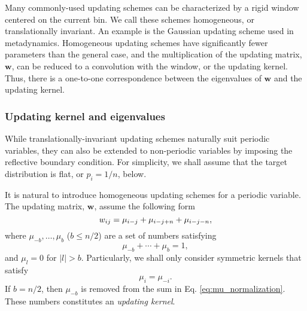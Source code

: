 \documentclass[reprint, floatfix]{revtex4-1}
\begin{document}
Many commonly-used updating schemes
can be characterized by a rigid window
centered on the current bin.
%
We call these schemes homogeneous,
or translationally invariant.
%
An example is the Gaussian updating scheme
used in metadynamics.
%
Homogeneous updating schemes have significantly fewer
parameters than the general case,
and the multiplication of the updating matrix,
$\mathbf w$,
can be reduced to a convolution with the window,
or the updating kernel.
%
Thus,
there is a one-to-one correspondence between
the eigenvalues of $\mathbf w$
and the updating kernel.



\subsubsection{\label{sec:bandkernel}
Updating kernel and eigenvalues}



While translationally-invariant
updating schemes
naturally suit periodic variables\cite{
dama2014},
they can also be extended to non-periodic variables
by imposing the reflective boundary condition\cite{
bussi2006}.
%
For simplicity, we shall assume that the target
distribution is flat, or $p_i = 1/n$, below.



It is natural to introduce homogeneous updating schemes
for a periodic variable\cite{dama2014}.
%
The updating matrix, $\mathbf w$,
assume the following form
%
\begin{equation}
  w_{ij}
  =
  \mu_{i-j}
  +
  \mu_{i-j+n}
  +
  \mu_{i-j-n}
  ,
\notag
\end{equation}
%
where
$\mu_{-b}, \dots, \mu_b$ ($b \le n/2$)
are a set of numbers satisfying
%
\begin{equation}
  \mu_{-b} + \cdots + \mu_b = 1
  ,
\label{eq:mu_normalization}
\end{equation}
%
and $\mu_l = 0$ for $|l| > b$.
%
Particularly,
we shall only consider symmetric kernels
that satisfy
%
\begin{equation}
  \mu_i = \mu_{-i}
  .
\label{eq:mu_symm}
\end{equation}
%
If $b = n/2$, then $\mu_{-b}$ is removed
from the sum in Eq. \eqref{eq:mu_normalization}.
%
These numbers constitutes an \emph{updating kernel}.
\end{document}
